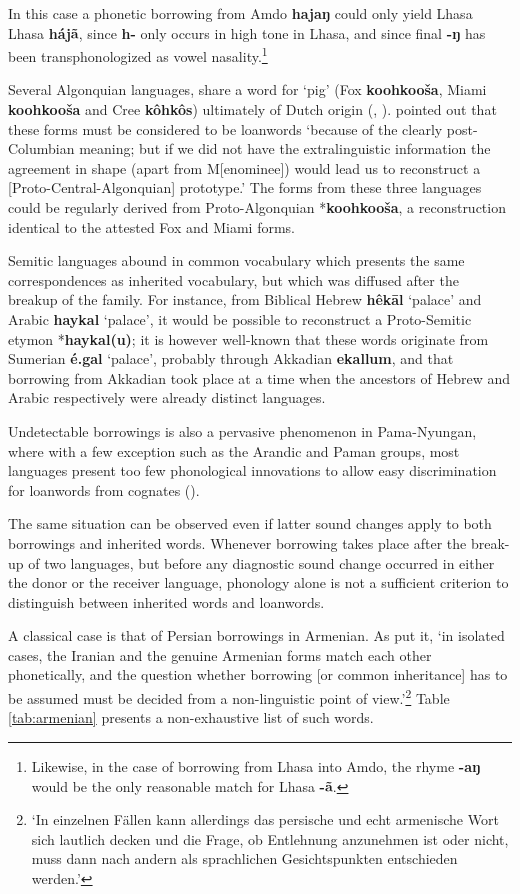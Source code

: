 \documentclass[svgnames,12pt]{scrartcl}
\newcommand{\ipa}[1]{\textbf{{\phon\mbox{#1}}}}
\begin{document}
{{In this case a phonetic borrowing from Amdo \ipa{hajaŋ} could only yield Lhasa Lhasa \ipa{hájã}, since \ipa{h-} only occurs in high tone in Lhasa, and since final \ipa{-ŋ} has been transphonologized as vowel nasality.\footnote{Likewise, in the case of borrowing from Lhasa into Amdo, the rhyme \ipa{-aŋ} would be the only reasonable match for Lhasa \ipa{-ã}.} 

Several Algonquian languages, share a word for `pig' (Fox \ipa{koohkooša}, Miami \ipa{koohkooša} and Cree \ipa{kôhkôs}) ultimately of Dutch origin (\citealt{goddard74dutch}, \citealt{costa13borrowing}). \citet[266]{hockett57k} pointed out that these forms must be considered to be loanwords `because of the clearly post-Columbian meaning; but if we did not have the extralinguistic information the agreement in shape (apart from M[enominee]) would lead us to reconstruct a [Proto-Central-Algonquian] prototype.' The forms from these three languages could be regularly derived from Proto-Algonquian *\ipa{koohkooša}, a reconstruction identical to the attested Fox and Miami forms.

Semitic languages abound in common vocabulary which presents the same correspondences as inherited vocabulary, but which was diffused after the breakup of the family. For instance, from Biblical Hebrew \ipa{hêkāl} `palace' and Arabic \ipa{haykal} `palace', it would be possible to reconstruct a Proto-Semitic etymon *\ipa{haykal(u)}; it is however well-known that these words originate from Sumerian \ipa{é.gal} `palace', probably through Akkadian \ipa{ekallum}, and that borrowing from Akkadian took place at a time when the ancestors of Hebrew and Arabic respectively were already distinct languages.

Undetectable borrowings is also a pervasive phenomenon in Pama-Nyungan, where with a few exception such as the Arandic and Paman groups, most languages present too few phonological innovations to allow easy discrimination for loanwords from cognates (\citealt[46]{koch04method}).

The same situation can be observed even if latter sound changes apply to both borrowings and inherited words. Whenever borrowing takes place after the break-up of two languages, but before any diagnostic sound change occurred in either the donor or the receiver language, phonology alone is not a sufficient criterion to distinguish between inherited words and loanwords. 


A classical case is that of Persian borrowings in Armenian. As \citet[16-17]{huebschmann97armenische} put it, `in isolated cases, the Iranian and the genuine Armenian forms match each other phonetically, and the question whether borrowing [or common inheritance] has to be assumed must be decided from a non-linguistic point of view.'\footnote{`In einzelnen Fällen kann allerdings das persische und echt armenische Wort sich lautlich decken und die Frage, ob Entlehnung anzunehmen ist oder nicht, muss dann nach andern als sprachlichen Gesichtspunkten entschieden werden.'} Table \ref{tab:armenian} presents a non-exhaustive list of such words.

}}
\end{document}
